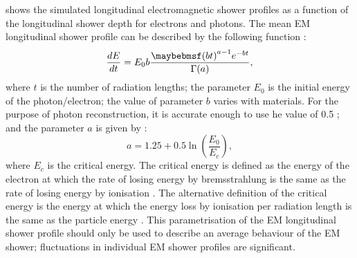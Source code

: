  shows the simulated longitudinal electromagnetic shower profiles as a function of the longitudinal shower depth for electrons and photons. The mean EM longitudinal shower profile can be described by the following function \cite{Longo:1975wb}:
\begin{equation}
\frac{dE}{dt} = E_0 b \frac{\parenths{bt}^{a-1}e^{-bt}}{\Gamma(a)},
\label{eq:photonEMshower}
\end{equation}
where $t$ is the number of radiation lengths; the parameter $E_0$ is the initial energy of the photon/electron; the value of parameter $b$ varies with materials. For the purpose  of photon reconstruction, it is accurate enough to use he value of 0.5  \cite{Agashe:2014kda}; and the parameter $a$ is given by \cite{Thomson:2009rp}:
\begin{equation}
a = 1.25 + 0.5\ln\left(\frac{E_0}{E_c}\right),
\end{equation}
where $E_c$ is the critical energy. The critical energy is defined as the energy of the electron at which the rate of losing energy by bremsstrahlung is the same as the rate of losing energy by ionisation \cite{1964NASSP3012.....B}. The alternative definition of the critical energy is the energy at which the energy loss by ionisation per radiation length is the same as the particle energy \cite{rossi1952high}. This parametrisation of the EM longitudinal shower profile should only be used to describe an average behaviour of the EM shower; fluctuations in individual EM shower profiles are significant.




